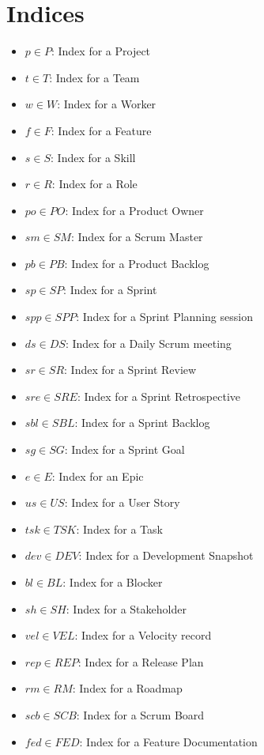 \documentclass[11pt]{article}
\begin{document}
\section{Indices}
\begin{itemize}
    \item $p \in P$: Index for a Project
    \item $t \in T$: Index for a Team
    \item $w \in W$: Index for a Worker
    \item $f \in F$: Index for a Feature
    \item $s \in S$: Index for a Skill
    \item $r \in R$: Index for a Role
    \item $po \in PO$: Index for a Product Owner
    \item $sm \in SM$: Index for a Scrum Master
    \item $pb \in PB$: Index for a Product Backlog
    \item $sp \in SP$: Index for a Sprint
    \item $spp \in SPP$: Index for a Sprint Planning session
    \item $ds \in DS$: Index for a Daily Scrum meeting
    \item $sr \in SR$: Index for a Sprint Review
    \item $sre \in SRE$: Index for a Sprint Retrospective
    \item $sbl \in SBL$: Index for a Sprint Backlog
    \item $sg \in SG$: Index for a Sprint Goal
    \item $e \in E$: Index for an Epic
    \item $us \in US$: Index for a User Story
    \item $tsk \in TSK$: Index for a Task
    \item $dev \in DEV$: Index for a Development Snapshot
    \item $bl \in BL$: Index for a Blocker
    \item $sh \in SH$: Index for a Stakeholder
    \item $vel \in VEL$: Index for a Velocity record
    \item $rep \in REP$: Index for a Release Plan
    \item $rm \in RM$: Index for a Roadmap
    \item $scb \in SCB$: Index for a Scrum Board
    \item $fed \in FED$: Index for a Feature Documentation
\end{itemize}
\end{document}
